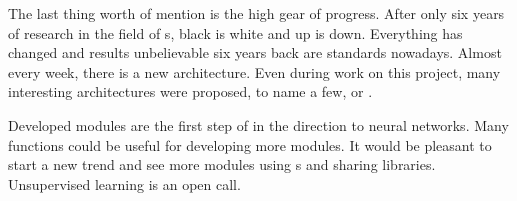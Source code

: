 The last thing worth of mention is the high gear of progress. After only six 
years of research in the field of s, black is white and up is down. 
Everything has changed and results unbelievable six years back are standards 
nowadays. Almost every week, there is a new architecture. Even during work on 
this project, many interesting architectures were proposed, to name a few, 
\cite{masklab} or \cite{panoptic}.

Developed modules are the first step of   in the direction to 
neural networks. Many functions could be useful for developing more modules. It 
would be pleasant to start a new trend and see more modules using s and 
sharing libraries. Unsupervised learning is an open call.
